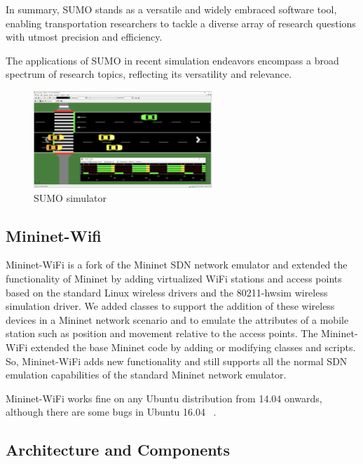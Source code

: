 \documentclass[
  oneside,
  11pt, a4paper,
  footinclude=true,
  headinclude=true,
  cleardoublepage=empty
]{scrbook}
\begin{document}
In summary, SUMO stands as a versatile and widely embraced software tool, enabling transportation researchers to tackle a diverse array of research questions with utmost precision and efficiency. 


The applications of SUMO in recent simulation endeavors encompass a broad spectrum of research topics, reflecting its versatility and relevance. 

\begin{figure}[H]
\begin{center}
  \includegraphics[width=0.6\textwidth]{img/sumo.png}
\end{center}
  \caption{SUMO simulator}
  \centering  
\label{sumo}
\end{figure}


\subsection{Mininet-Wifi}
\label{Mininet-Wifi}

Mininet-WiFi is a fork of the Mininet SDN network emulator and extended the functionality of Mininet by adding virtualized WiFi stations and access points based on the standard Linux wireless drivers and the 80211-hwsim wireless simulation driver. We added classes to support the addition of these wireless devices in a Mininet network scenario and to emulate the attributes of a mobile station such as position and movement relative to the access points.
The Mininet-WiFi extended the base Mininet code by adding or modifying classes and scripts. So, Mininet-WiFi adds new functionality and still supports all the normal SDN emulation capabilities of the standard Mininet network emulator.

Mininet-WiFi works fine on any Ubuntu distribution from 14.04 onwards, although there are some bugs in Ubuntu 16.04 ~\cite{mininet-wifibook}.

\subsection{Architecture and Components}
\end{document}
